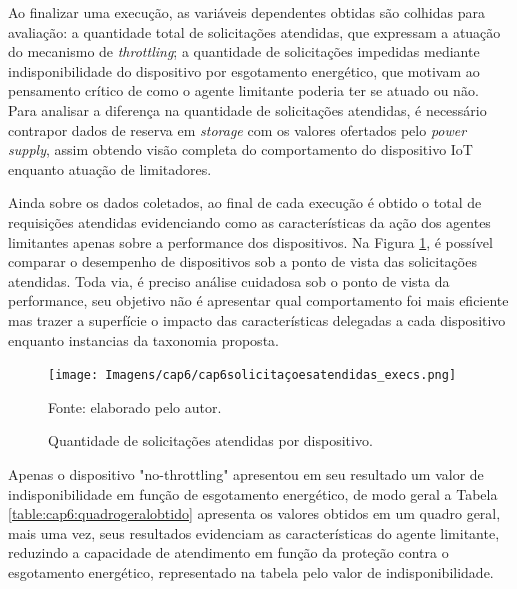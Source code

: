 Ao finalizar uma execução, as variáveis dependentes obtidas são colhidas para avaliação: a quantidade total de solicitações atendidas, que expressam a atuação do mecanismo de \textit{throttling}; a quantidade de solicitações impedidas mediante indisponibilidade do dispositivo por esgotamento energético, que motivam ao pensamento crítico de como o agente limitante poderia ter se atuado ou não. Para analisar a diferença na quantidade de solicitações atendidas, é necessário contrapor dados de reserva em \textit{storage} com os valores ofertados pelo \textit{power supply}, assim obtendo visão completa do comportamento do dispositivo \acs{IoT} enquanto atuação de limitadores.	

Ainda sobre os dados coletados, ao final de cada execução é obtido o total de requisições atendidas evidenciando como as características da ação dos agentes limitantes apenas sobre a performance dos dispositivos. Na Figura \ref{fig:cap6solicitacoesatendidas}, é possível comparar o desempenho de dispositivos sob a ponto de vista das solicitações atendidas. Toda via, é preciso análise cuidadosa sob o ponto de vista da performance, seu objetivo não é apresentar qual comportamento foi mais eficiente mas trazer a superfície o impacto das características delegadas a cada dispositivo enquanto instancias da taxonomia proposta.

\begin{figure}[H]
	\centering	
	\caption{Quantidade de solicitações atendidas por dispositivo.} 
	\label{fig:cap6solicitacoesatendidas}
	\noindent\texttt{[image: Imagens/cap6/cap6solicitaçoesatendidas\_execs.png]} 
	
	Fonte: elaborado pelo autor.
\end{figure}


Apenas o dispositivo "no-throttling" apresentou em seu resultado um valor de indisponibilidade em função de esgotamento energético, de modo geral a Tabela \ref{table:cap6:quadrogeralobtido} apresenta os valores obtidos em um quadro geral, mais uma vez, seus resultados evidenciam as características do agente limitante, reduzindo a capacidade de atendimento em função da proteção contra o esgotamento energético, representado na tabela pelo valor de indisponibilidade.

